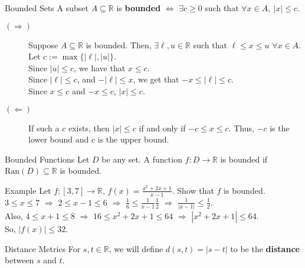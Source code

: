 \documentclass[10pt]{extarticle}
\newcommand{\ran}{\text{Ran}}
\newcommand{\R}{\mathbb{R}}
\begin{document}
  \begin{problem}{Bounded Sets}
    A subset $A\subseteq \R$ is \textbf{bounded} $\Leftrightarrow$  $\exists c \geq 0$ such that $\forall x\in A,~|x| \leq c$.
    \begin{description}
      \item[$(\Rightarrow)$] Suppose $A\subseteq \R$ is bounded. Then, $\exists \ell,u\in \R$ such that $\ell\leq x\leq u$ $\forall x\in A$. Let $c := \max\{|\ell|,|u|\}$.\\

        Since $|u| \leq c$, we have that $x\leq c$.\\

        Since $|\ell| \leq c$, and $-|\ell| \leq x$, we get that $-x \leq |\ell| \leq c$.\\

        Since $x\leq c$ and $-x\leq c$, $|x| \leq c$.
      \item[$(\Leftarrow)$] If such a $c$ exists, then $|x| \leq c$ if and only if $-c \leq x \leq c$. Thus, $-c$ is the lower bound and $c$ is the upper bound.
    \end{description}
    \begin{problem}{Bounded Functions}
      Let $D$ be any set. A function $f: D\rightarrow \R$ is bounded if $\ran(D)\subseteq \R$ is bounded.
    \end{problem}
    \begin{problem}{Example}
      Let $f: [3,7] \rightarrow \R$, $f(x) = \frac{x^2 + 2x + 1}{x-1}$. Show that $f$ is bounded.
      \tcblower
      $3\leq x \leq 7$ $\Rightarrow$ $2 \leq x-1 \leq 6$ $\Rightarrow$ $\frac{1}{6} \leq \frac{1}{x-1} \frac{1}{2}$ $\Rightarrow$ $\frac{1}{|x-1|} \leq \frac{1}{2}$.\\

      Also, $4 \leq x+1 \leq 8$ $\Rightarrow$ $16 \leq x^2 + 2x + 1 \leq 64$ $\Rightarrow$ $|x^2 + 2x + 1| \leq 64$.\\

      So, $|f(x)| \leq 32$.
    \end{problem}
    \begin{problem}{Distance Metrics}
      For $s,t\in\R$, we will define $d(s,t) = |s-t|$ to be the \textbf{distance} between $s$ and $t$.


\end{problem}
\end{problem}
\end{document}
